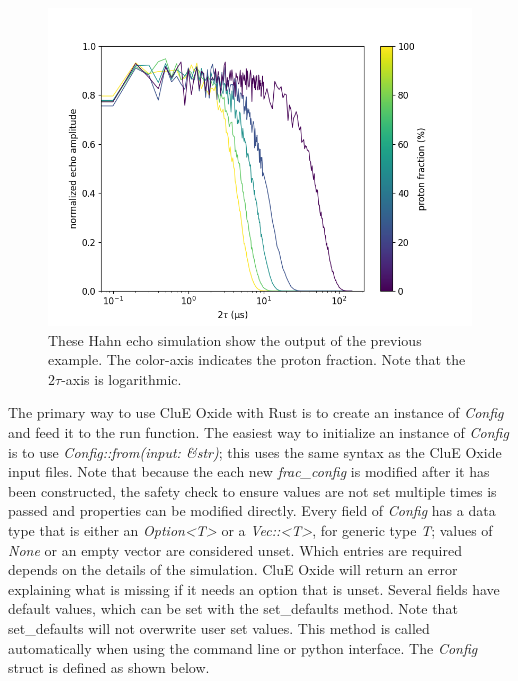 \documentclass{book}
\begin{document}
\begin{figure} [H]
	\centering
	\includegraphics[width=0.75\linewidth]{figs/fig_CluE-proton_fractions.png}
  \caption{These Hahn echo simulation show the output of the previous example.
  The color-axis indicates the proton fraction.
  Note that the $2\tau$-axis is logarithmic.
  }
  \label{fig:rust_out}
\end{figure}
%
The primary way to use CluE Oxide with Rust is to create an instance of 
\textit{Config} and feed it to the run function.
The easiest way to initialize an instance of \textit{Config} is to use 
\textit{Config::from(input: \&str)}; this uses the same syntax as the 
CluE Oxide input files. 
Note that because the each new \textit{frac\_config} is modified after it
has been constructed, the safety check to ensure values are not set multiple 
times is passed and properties can be modified directly.
Every field of \textit{Config} has a data type that is either an 
\textit{Option<T>} or a \textit{Vec::<T>}, for generic type \textit{T}; 
values of \textit{None} or an empty vector are considered unset.
Which entries are required depends on the details of the simulation.
CluE Oxide will return an error explaining what is missing if it needs an option that
is unset.  Several fields have default values, which can be set with the
set\_defaults method.  
Note that set\_defaults will not overwrite user set values.  
This method is called automatically when using the command line or python
interface.
The \textit{Config} struct is defined as shown below.
\end{document}
